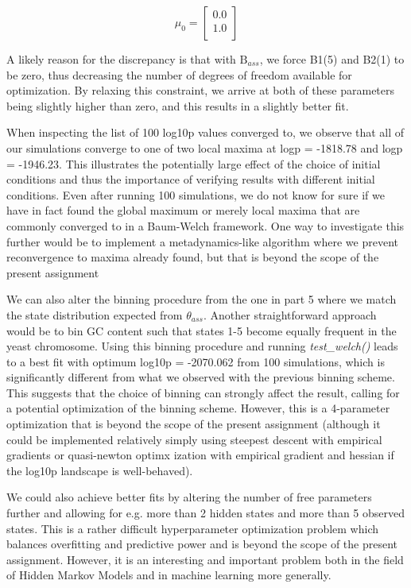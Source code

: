 \documentclass{article}
\begin{document}
\[
\mu_0 = 
\begin{bmatrix}
 0.0\\
 1.0\\
\end{bmatrix}
\]

A likely reason for the discrepancy is that with $\text{B}_{ass}$, we force B1(5) and B2(1) to be zero, thus decreasing the number of degrees of freedom available for optimization. By relaxing this constraint, we arrive at both of these parameters being slightly higher than zero, and this results in a slightly better fit.

When inspecting the list of 100 log10p values converged to, we observe that all of our simulations converge to one of two local maxima at logp = -1818.78 and logp = -1946.23. This illustrates the potentially large effect of the choice of initial conditions and thus the importance of verifying results with different initial conditions.
Even after running 100 simulations, we do not know for sure if we have in fact found the global maximum or merely local maxima that are commonly converged to in a Baum-Welch framework.
One way to investigate this further would be to implement a metadynamics-like algorithm where we prevent reconvergence to maxima already found, but that is beyond the scope of the present assignment

We can also alter the binning procedure from the one in part 5 where we match the state distribution expected from $\theta_{ass}$.
Another straightforward approach would be to bin GC content such that states 1-5 become equally frequent in the yeast chromosome.
Using this binning procedure and running \textit{test\_welch()} leads to a best fit with optimum log10p = -2070.062 from 100 simulations, which is significantly different from what we observed with the previous binning scheme.
This suggests that the choice of binning can strongly affect the result, calling for a potential optimization of the binning scheme. However, this is a 4-parameter optimization that is beyond the scope of the present assignment (although it could be implemented relatively simply using steepest descent with empirical gradients or quasi-newton optimx	ization with empirical gradient and hessian if the log10p landscape is well-behaved).

We could also achieve better fits by altering the number of free parameters further and allowing for e.g. more than 2 hidden states and more than 5 observed states. This is a rather difficult hyperparameter optimization problem which balances overfitting and predictive power and is beyond the scope of the present assignment. However, it is an interesting and important problem both in the field of Hidden Markov Models and in machine learning more generally.
\end{document}
